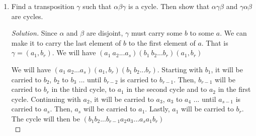 \documentclass[12pt]{article}
\renewcommand\qedsymbol{$\blacksquare$}
\newenvironment{solution}
{\begin{proof}[Solution]\renewcommand\qedsymbol{$\square$}}
 {\end{proof}}
\begin{document}
\begin{enumerate}
\begin{enumerate}[label=(\alph*)]
                \begin{proof}
                    Since $\alpha$ and $\beta$ are disjoint hence commute. That is $\alpha\beta = \beta\alpha$.
                    \begin{align*}
                        \alpha^n\beta^n &= \alpha... \alpha\alpha\alpha\beta\beta\beta...\beta \\
                        &= \alpha... \alpha\alpha\beta\alpha\beta\beta...\beta \\
                        &= \alpha... \alpha\beta\alpha\beta\alpha\beta...\beta \\
                    \end{align*}
                    keep substituting $\alpha\beta$ with $\beta\alpha$ until the first two cycles are $\alpha \beta$ we will have:\\
                    \begin{align*}
                        &= \alpha\beta...\alpha\beta \\
                    \end{align*}
                    Noticing that the total number of cycle $\alpha$ and $\beta$ is fixed, $\alpha\beta$ will repeat $n$ times, hence $\alpha^n\beta^n =  (\alpha\beta)^n$ .
                   
                \end{proof}
                \item Find a transposition $\gamma$ such that $\alpha \beta \gamma$ is a cycle. Then show that $\alpha \gamma \beta$ and $\gamma \alpha \beta$ are cycles.
                \begin{solution}
                    Since $\alpha$ and $\beta$ are disjoint, $\gamma$ must carry some $b$ to some $a$. We can make it to carry the last element of $b$ 
                    to the first element of $a$. That is $\gamma = (a_1,b_r)$. We will have $(a_1\ a_2...a_s)(b_1\ b_2...b_r)(a_1,b_r)$
                    
                    
                    
                    
                    We will have $(a_1\ a_2...a_s)(a_1,b_r)(b_1\ b_2...b_r)$. 
                    Starting with $b_1$, it will be carried to $b_2$,
                    $b_2$ to $b_3$ ... until $b_{r-2}$ is carried to $b_{r-1}$. Then, $b_{r-1}$ will be carried to $b_r$ in the third cycle, to $a_1$ in the second cycle and to $a_2$ in the first cycle. 
                    Continuing with $a_2$, it will be carried to $a_3$,
                    $a_3$ to $a_4$ ... until $a_{s-1}$ is carried to $a_s$. Then, $a_s$ will be carried to $a_1$. Lastly, $a_1$ will be carried to $b_r$. The cycle will then be $(b_1b_2...b_{r-1}a_2a_3...a_sa_1b_r)$\\
               

\end{solution}
\end{enumerate}
\end{enumerate}
\end{document}
